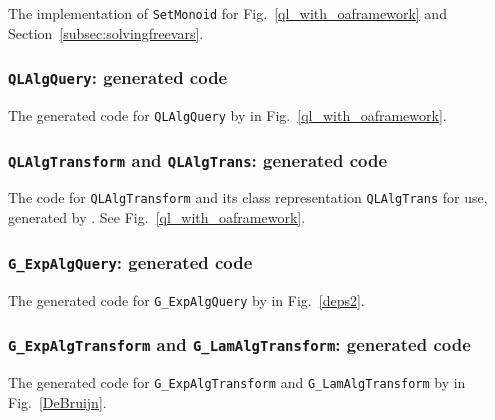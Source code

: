 The implementation of \lstinline{SetMonoid} for Fig.~\ref{ql_with_oaframework} and Section~\ref{subsec:solvingfreevars}.


\subsubsection{\lstinline{QLAlgQuery}: generated code}\label{subsec:appendix_code_qlalgquery}

The generated code for \lstinline{QLAlgQuery} by \Name in Fig.~\ref{ql_with_oaframework}.


\subsubsection{\lstinline{QLAlgTransform} and \lstinline{QLAlgTrans}: generated code}\label{subsec:appendix_code_qlalgtransform}

The code for \lstinline{QLAlgTransform} and its class representation \lstinline{QLAlgTrans} for use, generated by \Name. See Fig.~\ref{ql_with_oaframework}.


\subsubsection{\lstinline{G_ExpAlgQuery}: generated code}\label{subsec:appendix_code_g_expalgquery}

The generated code for \lstinline{G_ExpAlgQuery} by \Name in Fig.~\ref{deps2}.


\subsubsection{\lstinline{G_ExpAlgTransform} and \lstinline{G_LamAlgTransform}: generated code}\label{subsec:appendix_code_g_explam_transform}

The generated code for \lstinline{G_ExpAlgTransform} and \lstinline{G_LamAlgTransform} by \Name in Fig.~\ref{DeBruijn}.

